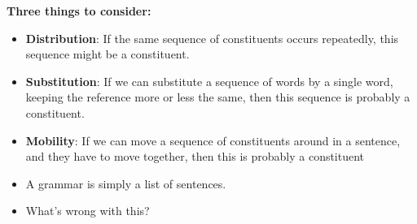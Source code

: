 \documentclass[a4paper,landscape,headrule,footrule]{foils}
\newenvironment{block}[1]%
  {%
    \par\medskip
    \noindent\textbf{#1}\par}%
  {%
    \medskip
  }
\begin{document}
\begin{block}{Three things to consider:}
  \begin{itemize}
  \item
    \textbf{Distribution}: If the same sequence of constituents occurs repeatedly, this sequence might be a constituent.  
  \item
    \textbf{Substitution}: If we can substitute a sequence of words by a single word, keeping the reference more or less the same, then this sequence is probably a constituent.
  \item
    \textbf{Mobility}: If we can move a sequence of constituents around in a sentence, and they have to move together, then this is probably a constituent
  \end{itemize}
\end{block}






\begin{itemize}
\item A grammar is simply a list of sentences.
\item What’s wrong with this?
\end{itemize}
\end{document}
